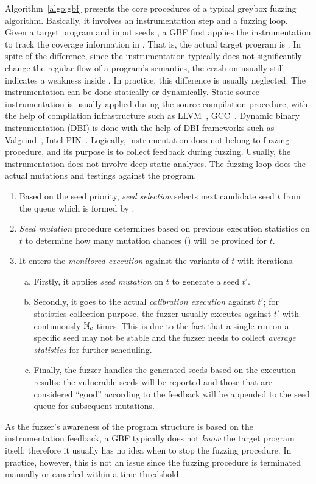 Algorithm~\ref{algo:gbf} presents the core procedures of a typical greybox fuzzing algorithm. Basically, it involves an instrumentation step and a fuzzing loop. Given a target program \ProgO and input seeds \Seeds, a GBF first applies the instrumentation to track the coverage information in \ProgO. That is, the actual target program is \Prog. In spite of the difference, since the instrumentation typically does not significantly change the regular flow of a program's semantics, the crash on \Prog usually still indicates a weakness inside \ProgO. In practice, this difference is usually neglected.
The instrumentation can be done statically or dynamically. Static source instrumentation is usually applied during the source compilation procedure, with the help of compilation infrastructure such as LLVM~\cite{Lattner:2004:LCF:977395.977673}, GCC~\cite{gcc}. Dynamic binary instrumentation (DBI) is done with the help of DBI frameworks such as Valgrind~\cite{valgrind}, Intel PIN~\cite{pin}. Logically, instrumentation does not belong to fuzzing procedure, and its purpose is to collect feedback during fuzzing. Usually, the instrumentation does not involve deep static analyses.
The fuzzing loop does the actual mutations and testings against the program.
\begin{enumerate}[1.]
	\item Based on the seed priority, \emph{seed selection} selects next candidate seed $t$ from the queue which is formed by \Seeds.
	\item \emph{Seed mutation} procedure determines based on previous execution statistics on $t$ to determine how many mutation chances (\mutChance) will be provided for $t$.
	\item It enters the \emph{monitored execution} against the variants of $t$ with \mutChance iterations. 
	\begin{enumerate}[a)]
	\item Firstly, it applies \emph{seed mutation} on $t$ to generate a seed $t'$. 
	\item Secondly, it goes to the actual \emph{calibration execution} against $t'$; for statistics collection purpose, the fuzzer usually executes \Prog against $t'$ with continuously $\mathbb{N}_{c}$ times. This is due to the fact that a single run on a specific seed may not be stable and the fuzzer needs to collect \emph{average statistics} for further scheduling.
	\item Finally, the fuzzer handles the generated seeds based on the execution results: the vulnerable seeds will be reported and those that are considered ``good'' according to the feedback will be appended to the seed queue for subsequent mutations.
	\end{enumerate}
\end{enumerate}
As the fuzzer's awareness of the program structure is based on the instrumentation feedback, a GBF typically does not \emph{know} the target program itself; therefore it usually has no idea when to stop the fuzzing procedure. In practice, however, this is not an issue since the fuzzing procedure is terminated manually or canceled within a time thredshold.

